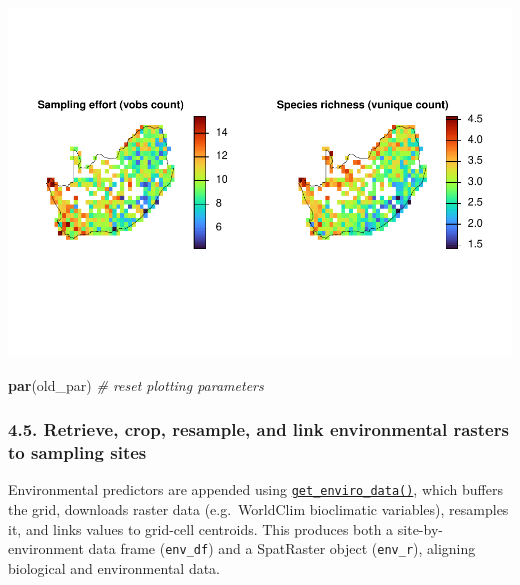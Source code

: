 \documentclass[
]{article}
\newenvironment{Shaded}{\begin{snugshade}}{\end{snugshade}}
\newcommand{\CommentTok}[1]{\textcolor[rgb]{0.56,0.35,0.01}{\textit{#1}}}
\newcommand{\FunctionTok}[1]{\textcolor[rgb]{0.13,0.29,0.53}{\textbf{#1}}}
\newcommand{\NormalTok}[1]{#1}
\begin{document}
\includegraphics[width=1\linewidth]{man/figures/README-grid-1}

\begin{Shaded}
\begin{Highlighting}[]

\FunctionTok{par}\NormalTok{(old\_par)  }\CommentTok{\# reset plotting parameters}
\end{Highlighting}
\end{Shaded}

\hypertarget{retrieve-crop-resample-and-link-environmental-rasters-to-sampling-sites}{%
\subsubsection{4.5. Retrieve, crop, resample, and link environmental
rasters to sampling
sites}\label{retrieve-crop-resample-and-link-environmental-rasters-to-sampling-sites}}

Environmental predictors are appended using
\href{https://macsands.github.io/dissmapr/reference/get_enviro_data.html}{\texttt{get\_enviro\_data()}},
which buffers the grid, downloads raster data (e.g.~WorldClim
bioclimatic variables), resamples it, and links values to grid-cell
centroids. This produces both a site-by-environment data frame
(\texttt{env\_df}) and a SpatRaster object (\texttt{env\_r}), aligning
biological and environmental data.
\end{document}
